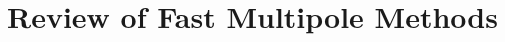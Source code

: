 
\chapter{Review of Fast Multipole Methods}\label{chpt:fmm}
\thispagestyle{chaptertitle} %














